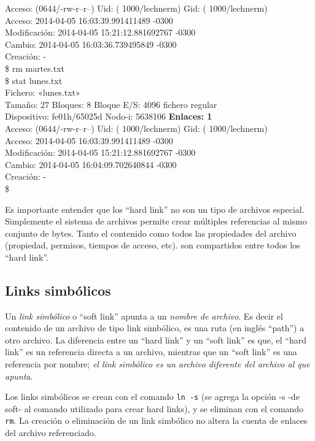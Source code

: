 \documentclass[12pt]{article}
\begin{document}
{{{Acceso: (0644/-rw-r--r--)  Uid: ( 1000/lechnerm)   Gid: ( 1000/lechnerm) \\
      Acceso: 2014-04-05 16:03:39.991411489 -0300 \\
Modificación: 2014-04-05 15:21:12.881692767 -0300 \\
      Cambio: 2014-04-05 16:03:36.739495849 -0300 \\
    Creación: - \\
\$ rm martes.txt  \\
\$ stat lunes.txt  \\
  Fichero: «lunes.txt» \\
  Tamaño: 27        	Bloques: 8          Bloque E/S: 4096   fichero regular \\
Dispositivo: fe01h/65025d	Nodo-i: 5638106     \textbf{Enlaces: 1} \\
Acceso: (0644/-rw-r--r--)  Uid: ( 1000/lechnerm)   Gid: ( 1000/lechnerm) \\
      Acceso: 2014-04-05 16:03:39.991411489 -0300 \\
Modificación: 2014-04-05 15:21:12.881692767 -0300 \\
      Cambio: 2014-04-05 16:04:09.702640844 -0300 \\
    Creación: - \\
\$ 
}
\vspace*{0.4cm} } }

Es importante entender que los ``hard link'' no son un tipo de archivos especial. 
Simplemente el sistema de archivos permite crear múltiples referencias al 
mismo conjunto de bytes. Tanto el contenido como todos las propiedades del archivo
(propiedad, permisos, tiempos de acceso, etc). son compartidos entre todos los 
``hard link''.  

\subsection*{Links simbólicos}
Un \textit{link simbólico} o ``soft link'' apunta a un \textit{nombre de archivo}.
Es decir el contenido de un archivo de tipo link simbólico, es una ruta 
(en inglés ``path'') a otro archivo. La diferencia entre un ``hard link'' y un 
``soft link'' es que, el ``hard link'' es un referencia directa a un archivo, 
mientras que un ``soft link'' es una referencia por nombre; \textit{el link simbólico
es un archivo diferente del archivo al que apunta}.  


Los links simbólicos se crean con el comando \texttt{ln -s} (se agrega la opción -s
-de soft- al comando utilizado para crear hard links), y se eliminan con el comando 
\texttt{rm}. La creación o eliminación de un link simbólico no altera la cuenta de 
enlaces del archivo referenciado. 
\end{document}
